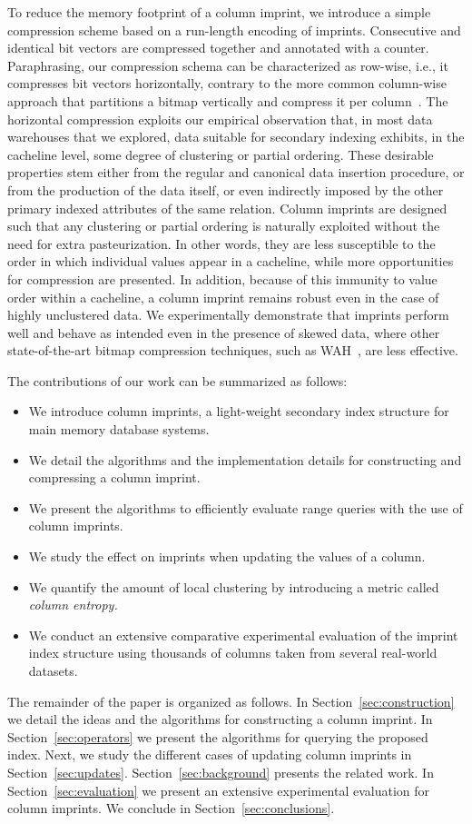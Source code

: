 To reduce the memory footprint of a column imprint, we introduce a simple
compression scheme based on a run-length encoding of imprints. Consecutive and
identical bit vectors are compressed together and annotated with a counter.
Paraphrasing, our compression
schema can be characterized as row-wise, i.e., it compresses bit vectors
horizontally, contrary to the more common column-wise approach that partitions
a bitmap vertically and compress it per column~\cite{WOS02}. The horizontal
compression exploits our empirical observation that, in most data warehouses
that we explored, data suitable for secondary indexing exhibits, in the
cacheline level, some degree of clustering or partial ordering. These desirable
properties stem either from the regular and canonical data insertion procedure,
or from the production of the data itself, or even indirectly imposed by the
other primary indexed attributes of the same relation. Column imprints are
designed such that any clustering or partial ordering is naturally exploited
without the need for extra pasteurization. In other words, they are less
susceptible to the order in which individual values appear in a cacheline,
while more opportunities for compression are presented. In addition,
because of this immunity to value order within a cacheline, a column imprint
remains robust even in the case of highly unclustered data. We experimentally
demonstrate that imprints perform well and behave as intended even in the
presence of skewed data, where other state-of-the-art bitmap compression
techniques, such as WAH~\cite{WOS02}, are less effective.

The contributions of our work can be summarized as follows:
\begin{itemize}
\item We introduce column imprints, a light-weight secondary index
structure for main memory database systems.
\item We detail the algorithms and the implementation details for constructing
and compressing a column imprint.
\item We present the algorithms to efficiently evaluate range queries with the
use of column imprints.
\item We study the effect on imprints when updating the values of a column.
\item We quantify the amount of local clustering by introducing
a metric called \it{column entropy}.
\item We conduct an extensive comparative experimental evaluation of
the imprint index structure using thousands of columns taken from several
real-world datasets.
\end{itemize}

The remainder of the paper is organized as follows. In
Section~\ref{sec:construction} we detail the ideas and the algorithms for
constructing a column imprint. In Section~\ref{sec:operators} we present the
algorithms for querying the proposed index. Next, we study the different cases
of updating column imprints in Section~\ref{sec:updates}.
Section~\ref{sec:background} presents the related work. In
Section~\ref{sec:evaluation} we present an extensive experimental evaluation
for column imprints. We conclude in Section~\ref{sec:conclusions}.

